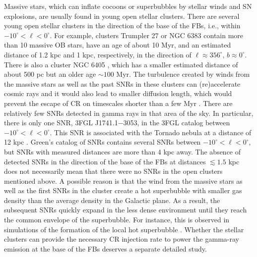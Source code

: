 Massive stars, which can inflate cocoons or superbubbles by stellar winds and SN explosions, are usually found in young open stellar clusters.
There are several young open stellar clusters in the direction of the base of the FBs, i.e., within $-10^\circ < \ell  < 0^\circ$.
For example, clusters Trumpler 27 \citep{1977ApJ...215..106M} or NGC 6383 \citep{1978MNRAS.184..661L}
contain more than 10 massive OB stars, have an age of about 10 Myr, and an estimated distance of 1.2 kpc and 1 kpc, respectively,
in the direction of $\ell \approx 356^\circ$, $b \approx 0^\circ$.
There is also a cluster NGC 6405 \citep{1959ZA.....47...15R}, which has a smaller estimated distance of about 500 pc
but an older age $\sim 100$ Myr.
The turbulence created by winds from the massive stars as well as the past SNRs in these clusters can (re)accelerate cosmic rays and
it would also lead to smaller diffusion length, which would prevent the escape of CR on timescales shorter than a few Myr \citep{2011Sci...334.1103A}.
There are relatively few SNRs detected in gamma rays in that area of the sky.
In particular, there is only one SNR, 3FGL J1741.1$-$3053, in the 3FGL catalog \citep{2015ApJS..218...23A}
between $-10^\circ < \ell  < 0^\circ$.
This SNR is associated with the Tornado nebula at a distance of 12 kpc \citep{2013ApJ...774...36C}.
Green's catalog of SNRs %
contains several SNRs between $-10^\circ < \ell  < 0^\circ$, but SNRs with measured distances are more than 4 kpc away.
The absence of detected SNRs in the direction of the base of the FBs at distances $\lesssim 1.5$ kpc 
does not necessarily mean that there were no SNRs in the open clusters mentioned above.
A possible reason is that the wind from the massive stars as well as the first SNRs in the cluster create a hot superbubble
with smaller gas density than the average density in the Galactic plane. As a result, the subsequent SNRs quickly expand
in the less dense environment until they reach the common envelope of the superbubble.
For instance, this is observed in simulations of the formation of the local hot superbubble
\citep{2016Natur.532...73B, 2017A&A...604A..81S, 2018Galax...6...26S}.
Whether the stellar clusters can provide the necessary CR injection rate to power the gamma-ray emission at the base
of the FBs deserves a separate detailed study.


